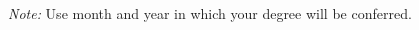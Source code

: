 %

\begin{spacing}{1.0}

\end{spacing}
\nocite{*}
%
%
%
%
%

\flushleft
\textit{Note:} Use month and year in which your degree will be conferred.

\begin{thesisshorttitlepage}
\end{thesisshorttitlepage}

